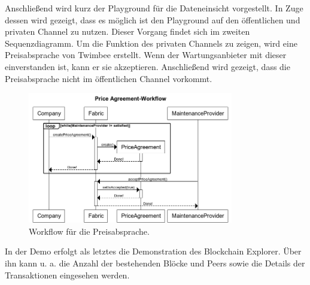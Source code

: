 Anschließend wird kurz der Playground für die Dateneinsicht vorgestellt. In Zuge dessen wird gezeigt, dass es möglich ist den Playground auf den öffentlichen und privaten Channel zu nutzen. Dieser Vorgang findet sich im zweiten Sequenzdiagramm. Um die Funktion des privaten Channels zu zeigen, wird eine Preisabsprache von Twimbee erstellt. Wenn der Wartungsanbieter mit dieser einverstanden ist, kann er sie akzeptieren. Anschließend wird gezeigt, dass die Preisabsprache nicht im öffentlichen Channel vorkommt.

\begin{figure}[!htbp]
    \centering
      \includegraphics[width=0.8\textwidth,angle=0]{images/priceagreement-workflow}
       \caption{Workflow für die Preisabsprache.}
      \label{fig:priceagreement-workflow}
\end{figure}

In der Demo erfolgt als letztes die Demonstration des Blockchain Explorer. Über ihn kann u. a. die Anzahl der bestehenden Blöcke und Peers sowie die Details der Transaktionen eingesehen werden.